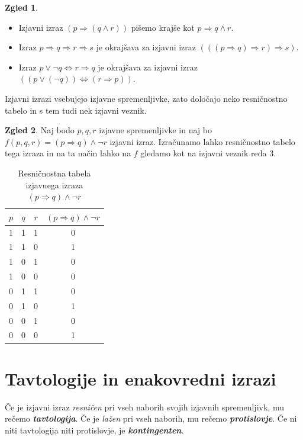 \documentclass[11pt]{book}
\def\definicija{\color{rdeca}\bf\em}
\theoremstyle{definition}
\theoremstyle{zgled}
\newtheorem*{zgled}{Zgled}
\theoremstyle{odprtproblem}
\theoremstyle{domacanaloga}
\theoremstyle{izrek}
\begin{document}
\begin{zgled} \leavevmode
\begin{itemize}
    \item Izjavni izraz $(p \Rightarrow (q \land r))$ pišemo krajše kot $p \Rightarrow q \land r$.
    \item Izraz $p \Rightarrow q \Rightarrow r \Rightarrow s$ je okrajšava za izjavni izraz $(((p \Rightarrow q) \Rightarrow r) \Rightarrow s)$.
    \item Izraz $p \lor \lnot q \Leftrightarrow r \Rightarrow q$ je okrajšava za izjavni izraz $(( p \lor (\lnot q)) \Leftrightarrow (r \Rightarrow p))$.
\end{itemize}
\end{zgled}

Izjavni izrazi vsebujejo izjavne spremenljivke, zato določajo neko resničnostno tabelo in s tem tudi nek izjavni veznik.

\begin{zgled}
Naj bodo $p,q,r$ izjavne spremenljivke in naj bo $f(p,q,r) = (p \Rightarrow q) \land \lnot r$ izjavni izraz. Izračunamo lahko resničnostno tabelo tega izraza in na ta način lahko na $f$ gledamo kot na izjavni veznik reda $3$.

\begin{table}[h]
    \centering
    \begin{tabular}{ccc|c}
        $p$ & $q$ & $r$ & $(p \Rightarrow q) \land \lnot r$ \\ \hline
        1 & 1 & 1 & 0 \\
        1 & 1 & 0 & 1 \\
        1 & 0 & 1 & 0 \\
        1 & 0 & 0 & 0 \\
        0 & 1 & 1 & 0 \\
        0 & 1 & 0 & 1 \\
        0 & 0 & 1 & 0 \\
        0 & 0 & 0 & 1
    \end{tabular}
    \caption{Resničnostna tabela izjavnega izraza $(p \Rightarrow q) \land \lnot r$}
\end{table}
\end{zgled}

\section{Tavtologije in enakovredni izrazi}

Če je izjavni izraz \emph{resničen} pri vseh naborih svojih izjavnih spremenljivk, mu rečemo {\definicija tavtologija}. Če je \emph{lažen} pri vseh naborih, mu rečemo {\definicija protislovje}. Če ni niti tavtologija niti protislovje, je {\definicija kontingenten}.
\end{document}
